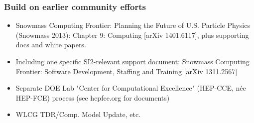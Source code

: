 \begin{frame}
\frametitle{Build on earlier community efforts}
\begin{itemize}
\item Snowmass Computing Frontier: Planning the Future of U.S. Particle Physics (Snowmass 2013): Chapter 9: Computing [arXiv 1401.6117], plus supporting docs and white papers.

\item \underline{Including one specific SI2-relevant support document}: Snowmass Computing Frontier: Software Development, Staffing and Training [arXiv 1311.2567]

\item Separate DOE Lab "Center for Computational Excellence" (HEP-CCE, n\'{e}e HEP-FCE) process (see hepfce.org for documents)

\item WLCG TDR/Comp. Model Update, etc.
\end{itemize}

\end{frame}


